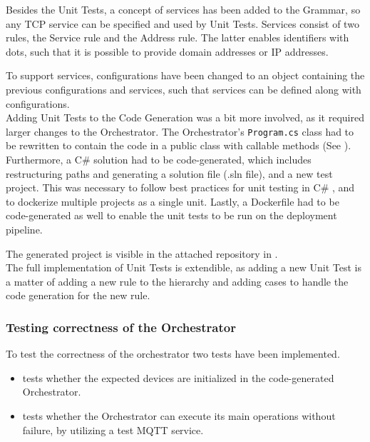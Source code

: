 Besides the Unit Tests, a concept of services has been added to the Grammar, so any TCP service can be specified and used by Unit Tests. Services consist of two rules, the Service rule and the Address rule. The latter enables identifiers with dots, such that it is possible to provide domain addresses or IP addresses. 

To support services, configurations have been changed to an object containing the previous configurations and services, such that services can be defined along with configurations.\\



Adding Unit Tests to the Code Generation was a bit more involved, as it required larger changes to the Orchestrator. The Orchestrator's \texttt{Program.cs} class had to be rewritten to contain the code in a public class with callable methods (See ). Furthermore, a C\# solution had to be code-generated, which includes restructuring paths and generating a solution file (.sln file), and a new test project. This was necessary to follow best practices for unit testing in C\# \cite{dotnet-project-structure}, and to dockerize multiple projects as a single unit. Lastly, a Dockerfile  had to be code-generated as well to enable the unit tests to be run on the deployment pipeline. 

The generated project is visible in the attached repository in .\\

The full implementation of Unit Tests is extendible, as adding a new Unit Test is a matter of adding a new rule to the hierarchy and adding cases to handle the code generation for the new rule.

\subsubsection*{Testing correctness of the Orchestrator}

To test the correctness of the orchestrator two tests have been implemented. 

\begin{itemize}
    \item {} tests whether the expected devices are initialized in the code-generated Orchestrator.
    \item {} tests whether the Orchestrator can execute its main operations without failure, by utilizing a test MQTT service.
\end{itemize}

